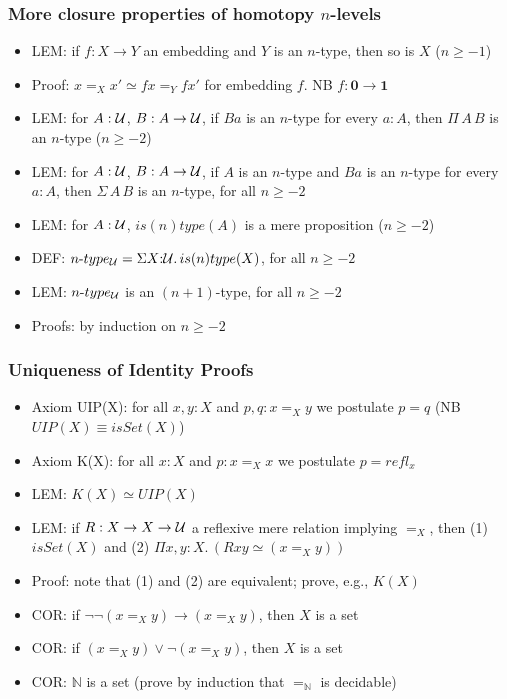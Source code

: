 \documentclass[handout]{beamer}
\newcommand{\depi}[3]{\Pi{#1{:}#2.\,#3}}
\newcommand{\sigm}[3]{\Sigma{#1{:}#2.\,#3}}
\newcommand{\Nat}{\mathbb{N}}
\newcommand{\UU}{{\cal U}}
\newcommand{\bfnull}{\mathbf{0}}
\newcommand{\bfone}{\mathbf{1}}
\begin{document}
   \frame
  {
    \frametitle{More closure properties of homotopy $n$-levels}
    
\begin{itemize} 
    \item LEM: if $f:X\to Y$ an embedding and $Y$ is an $n$-type, then so is $X$ ($n\geq-1$)
    \item Proof: $x=_X x' \simeq fx=_Y fx'$ for embedding $f$. NB $f:\bfnull\to\bfone$
    \item LEM:  for $A:\UU$, $B:A\to\UU$, if $Ba$ is an $n$-type for every $a:A$, then $\Pi\,A\,B$ is an $n$-type ($n\geq-2$)
    \item LEM:  for $A:\UU$, $B:A\to\UU$, if $A$ is an  $n$-type and $Ba$ is an $n$-type for every $a:A$, then $\Sigma\,A\,B$ is an $n$-type, for all $n\geq-2$
    \item LEM:  for $A:\UU$, $is(n)type(A)$ is a mere proposition ($n\geq-2$)
    \item DEF: $n\mbox{-}type_\UU = \sigm{X}{\UU}{is(n)type(X)}$, for all $n\geq-2$
    \item LEM: $n\mbox{-}type_\UU$ is an $(n+1)$-type, for all $n\geq-2$
    \item Proofs: by induction on $n\geq-2$
\end{itemize}
  }

   
         \frame
  {
    \frametitle{Uniqueness of Identity Proofs}
    
\begin{itemize}
    \item Axiom UIP(X): for all $x,y:X$ and $p,q: x =_X y$ we postulate $p=q$ (NB $UIP(X) \equiv isSet(X)$)
    \item Axiom K(X): for all $x:X$ and $p: x =_X x$ we postulate $p=refl_x$
    \item LEM:  $K(X) \simeq UIP(X)$
    \item LEM: if $R:X\to X\to\UU$ a reflexive mere relation implying $=_X$, 
             then (1) $isSet(X)$ and (2) $\depi{x,y}{X}{(Rxy \simeq (x=_X y))}$
    \item Proof: note that (1) and (2) are equivalent; prove, e.g., $K(X)$
    \item COR: if $\neg\neg(x=_X y) \to (x=_X y)$, then $X$ is a set
    \item COR: if $(x=_X y) \lor \neg(x=_X y)$, then $X$ is a set
    \item COR: $\Nat$ is a set (prove by induction that $=_\Nat$ is decidable)
\end{itemize}
  }
  
\end{document}
